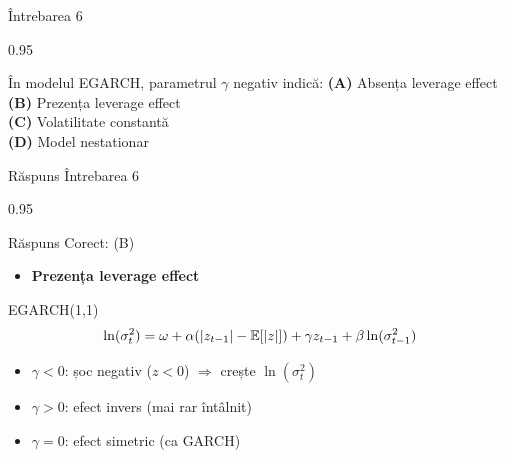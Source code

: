\documentclass[9pt, aspectratio=169, t]{beamer}
\begin{document}
\begin{frame}{Întrebarea 6}
    \begin{cminipage}{0.95\textwidth}
    \begin{block}{În modelul EGARCH, parametrul $\gamma$ negativ indică:}
        \textcolor{MainBlue}{\textbf{(A)}} Absența leverage effect\\[3pt]
        \textcolor{MainBlue}{\textbf{(B)}} Prezența leverage effect\\[3pt]
        \textcolor{MainBlue}{\textbf{(C)}} Volatilitate constantă\\[3pt]
        \textcolor{MainBlue}{\textbf{(D)}} Model nestationar
    \end{block}
    \end{cminipage}
\end{frame}

\begin{frame}{Răspuns Întrebarea 6}
    \begin{cminipage}{0.95\textwidth}
    \begin{exampleblock}{Răspuns Corect: (B)}
        \begin{itemize}\setlength{\itemsep}{0pt}
            \item \textbf{Prezența leverage effect}
        \end{itemize}
    \end{exampleblock}

    \pause
    \begin{block}{EGARCH(1,1)}
        \[
            \ln(\sigma_t^2) = \omega + \alpha (|z_{t-1}| - \mathbb{E}[|z|]) + \gamma z_{t-1} + \beta \ln(\sigma_{t-1}^2)
        \]

        \begin{itemize}\setlength{\itemsep}{0pt}
            \item $\gamma < 0$: șoc negativ ($z < 0$) $\Rightarrow$ crește $\ln(\sigma_t^2)$
            \item $\gamma > 0$: efect invers (mai rar întâlnit)
            \item $\gamma = 0$: efect simetric (ca GARCH)
        \end{itemize}
    \end{block}
    \end{cminipage}
\end{frame}
\end{document}
